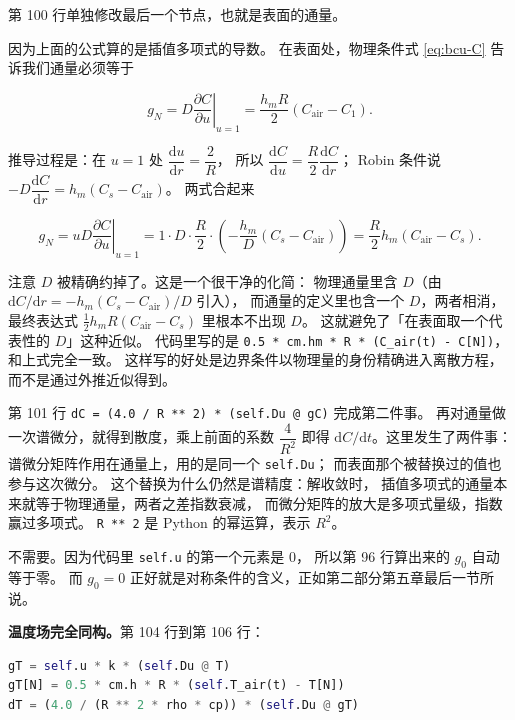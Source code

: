 第 100 行单独修改最后一个节点，也就是表面的通量。

因为上面的公式算的是插值多项式的导数。
在表面处，物理条件式 \eqref{eq:bcu-C} 告诉我们通量必须等于

\begin{equation}
g_N = D\left.\frac{\partial C}{\partial u}\right|_{u=1}
= \frac{h_mR}{2}\left(C_{\mathrm{air}}-C_1\right).
\end{equation}

推导过程是：在 $u=1$ 处 $\dfrac{\mathrm{d}u}{\mathrm{d}r}=\dfrac{2}{R}$，
所以 $\dfrac{\mathrm{d}C}{\mathrm{d}u}=\dfrac{R}{2}\dfrac{\mathrm{d}C}{\mathrm{d}r}$；
Robin 条件说 $-D\dfrac{\mathrm{d}C}{\mathrm{d}r}=h_m(C_s-C_{\mathrm{air}})$。
两式合起来

\begin{equation}
g_N=\left.uD\frac{\partial C}{\partial u}\right|_{u=1}
=1\cdot D\cdot\frac{R}{2}\cdot\left(-\frac{h_m}{D}(C_s-C_{\mathrm{air}})\right)
=\frac{R}{2}h_m\left(C_{\mathrm{air}}-C_s\right).
\end{equation}

注意 $D$ 被精确约掉了。这是一个很干净的化简：
物理通量里含 $D$（由 $\mathrm{d}C/\mathrm{d}r=-h_m(C_s-C_{\mathrm{air}})/D$ 引入），
而通量的定义里也含一个 $D$，两者相消，
最终表达式 $\frac12h_mR(C_{\mathrm{air}}-C_s)$ 里根本不出现 $D$。
这就避免了「在表面取一个代表性的 $D$」这种近似。
代码里写的是 \texttt{0.5 * cm.hm * R * (C\_air(t) - C[N])}，和上式完全一致。
这样写的好处是边界条件以物理量的身份精确进入离散方程，
而不是通过外推近似得到。

第 101 行 \texttt{dC = (4.0 / R ** 2) * (self.Du @ gC)} 完成第二件事。
再对通量做一次谱微分，就得到散度，乘上前面的系数 $\dfrac{4}{R^2}$
即得 $\mathrm{d}C/\mathrm{d}t$。这里发生了两件事：
谱微分矩阵作用在通量上，用的是同一个 \texttt{self.Du}；
而表面那个被替换过的值也参与这次微分。
这个替换为什么仍然是谱精度：解收敛时，
插值多项式的通量本来就等于物理通量，两者之差指数衰减，
而微分矩阵的放大是多项式量级，指数赢过多项式。
\texttt{R ** 2} 是 Python 的幂运算，表示 $R^2$。

不需要。因为代码里 \texttt{self.u} 的第一个元素是 $0$，
所以第 96 行算出来的 $g_0$ 自动等于零。
而 $g_0=0$ 正好就是对称条件的含义，正如第二部分第五章最后一节所说。

\textbf{温度场完全同构。}第 104 行到第 106 行：

\begin{lstlisting}[language=Python]
gT = self.u * k * (self.Du @ T)
gT[N] = 0.5 * cm.h * R * (self.T_air(t) - T[N])
dT = (4.0 / (R ** 2 * rho * cp)) * (self.Du @ gT)
\end{lstlisting}

